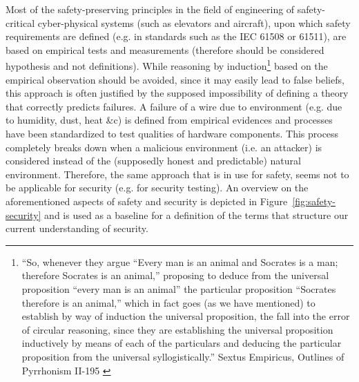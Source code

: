 \documentclass[conference]{IEEEtran}
\begin{document}
Most of the safety-preserving principles in the field of engineering of
safety-critical cyber-physical systems (such as elevators and aircraft), upon
which safety requirements are defined (e.g. in standards such as the IEC 61508
or 61511\cite{IEC201761511}), are based on empirical tests and measurements
(therefore should be considered hypothesis and not definitions). While
reasoning by induction\footnote{``So, whenever they argue ``Every man is an
animal and Socrates is a man; therefore Socrates is an animal,'' proposing to
deduce from the universal proposition ``every man is an animal'' the particular
proposition ``Socrates therefore is an animal,'' which in fact goes (as we have
mentioned) to establish by way of induction the universal proposition, the
fall into the error of circular reasoning, since they are establishing the
universal proposition inductively by means of each of the particulars and
deducing the particular proposition from the universal syllogistically.''
Sextus Empiricus, Outlines of Pyrrhonism II-195 \cite{Empiricus1990Pyrrhonism}}
based on the empirical observation should be avoided, since it may easily lead
to false beliefs, this approach is often justified by the supposed
impossibility of defining a theory that correctly predicts failures.  A failure
of a wire due to environment (e.g. due to humidity, dust, heat \&c) is defined
from empirical evidences and processes have been standardized to test qualities
of hardware components.  This process completely breaks down when a malicious
environment (i.e. an attacker) is considered instead of the (supposedly honest
and predictable) natural environment. Therefore, the same approach that is in
use for safety, seems not to be applicable for security (e.g. for security
testing).
An overview on the aforementioned aspects of safety and security is depicted in
Figure~\ref{fig:safety-security} and is used as a baseline for a definition of
the terms that structure our current understanding of security. 
\end{document}
